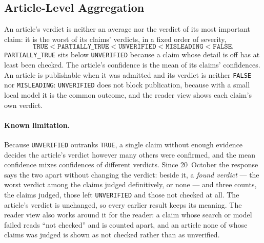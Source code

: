 
\subsection{Article-Level Aggregation}
\label{subsec:aggregation}

An article's verdict is neither an average nor the verdict of its most
important claim: it is the worst of its claims' verdicts, in a fixed
order of severity,
\[
  \texttt{TRUE} < \texttt{PARTIALLY\_TRUE} < \texttt{UNVERIFIED} <
  \texttt{MISLEADING} < \texttt{FALSE}.
\]
\texttt{PARTIALLY\_TRUE} sits below \texttt{UNVERIFIED} because a
claim whose detail is off has at least been checked. The article's
confidence is the mean of its claims' confidences. An article is
publishable when it was admitted and its verdict is neither
\texttt{FALSE} nor \texttt{MISLEADING}: \texttt{UNVERIFIED} does not
block publication, because with a small local model it is the common
outcome, and the reader view shows each claim's own verdict.

\paragraph{Known limitation.} Because \texttt{UNVERIFIED} outranks
\texttt{TRUE}, a single claim without enough evidence decides the
article's verdict however many others were confirmed, and the mean
confidence mixes confidences of different verdicts. Since 20~October
the response says the two apart without changing the verdict: beside
it, a \emph{found verdict} --- the worst verdict among the claims judged
definitively, or none --- and three counts, the claims judged, those
left \texttt{UNVERIFIED} and those not checked at all. The article's
verdict is unchanged, so every earlier result keeps its meaning. The
reader view also works around it for the reader: a claim whose search or model failed reads ``not checked''
and is counted apart, and an article none of whose claims was judged is
shown as not checked rather than as unverified.
